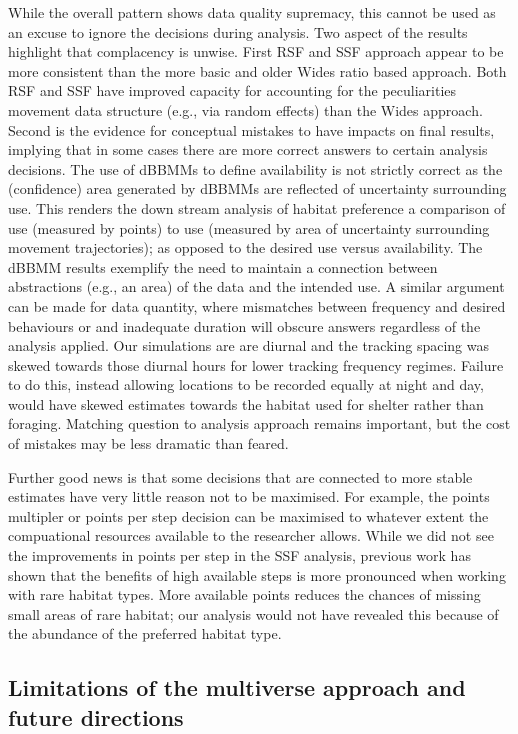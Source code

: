 \documentclass[10pt,a4paper]{article}
\begin{document}
While the overall pattern shows data quality supremacy, this cannot be used as an excuse to ignore the decisions during analysis.
Two aspect of the results highlight that complacency is unwise.
First RSF and SSF approach appear to be more consistent than the more basic and older Wides ratio based approach.
Both RSF and SSF have improved capacity for accounting for the peculiarities movement data structure (e.g., via random effects) than the Wides approach.
Second is the evidence for conceptual mistakes to have impacts on final results, implying that in some cases there are more correct answers to certain analysis decisions.
The use of dBBMMs to define availability is not strictly correct as the (confidence) area generated by dBBMMs are reflected of uncertainty surrounding use.
This renders the down stream analysis of habitat preference a comparison of use (measured by points) to use (measured by area of uncertainty surrounding movement trajectories); as opposed to the desired use versus availability.
The dBBMM results exemplify the need to maintain a connection between abstractions (e.g., an area) of the data and the intended use.
A similar argument can be made for data quantity, where mismatches between frequency and desired behaviours or and inadequate duration will obscure answers regardless of the analysis applied.
Our simulations are are diurnal and the tracking spacing was skewed towards those diurnal hours for lower tracking frequency regimes.
Failure to do this, instead allowing locations to be recorded equally at night and day, would have skewed estimates towards the habitat used for shelter rather than foraging.
Matching question to analysis approach remains important, but the cost of mistakes may be less dramatic than feared.

Further good news is that some decisions that are connected to more stable estimates have very little reason not to be maximised.
For example, the points multipler or points per step decision can be maximised to whatever extent the compuational resources available to the researcher allows.
While we did not see the improvements in points per step in the SSF analysis, previous work has shown that the benefits of high available steps is more pronounced when working with rare habitat types.
More available points reduces the chances of missing small areas of rare habitat; our analysis would not have revealed this because of the abundance of the preferred habitat type.

\hypertarget{limitations-of-the-multiverse-approach-and-future-directions}{%
\subsection{Limitations of the multiverse approach and future directions}\label{limitations-of-the-multiverse-approach-and-future-directions}}
\end{document}

